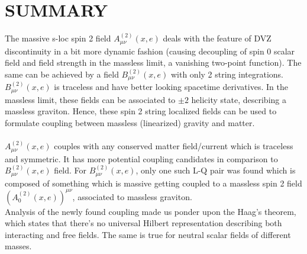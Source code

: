 \documentclass[12pt,a4paper]{article}
\numberwithin{equation}{section}
\begin{document}
\section{SUMMARY}
The massive s-loc spin 2 field $A^{(2)}_{\mu\nu}(x,e)$  deals with the feature of DVZ discontinuity in a bit more dynamic fashion (causing decoupling of spin 0 scalar field and field strength in the massless limit, a vanishing two-point function). The same can be achieved by a field $B^{(2)}_{\mu\nu}(x,e)$ with only 2 string integrations. $B^{(2)}_{\mu\nu}(x,e)$ is traceless and have better looking spacetime derivatives. In the massless limit, these fields can be associated to $\pm2$ helicity state, describing a massless graviton. Hence, these  spin 2 string localized fields can be used to formulate coupling between massless (linearized) gravity and matter. \\\\
$A^{(2)}_{\mu\nu}(x,e)$ couples with any conserved matter field/current which is traceless and symmetric. It has more potential coupling candidates in comparison to $B^{(2)}_{\mu\nu}(x,e)$ field. For $B^{(2)}_{\mu\nu}(x,e)$, only one such L-Q pair was found which is  composed of something which is massive getting coupled to a massless spin 2 field $(A^{(2)}_0(x,e))^{\mu\nu}$, associated to massless graviton.\\
Analysis of the newly found coupling made us ponder upon the Haag's theorem, which states that there's no universal Hilbert representation describing both interacting and free fields. The same is true for neutral scalar fields of different masses.  
\newpage
\end{document}
